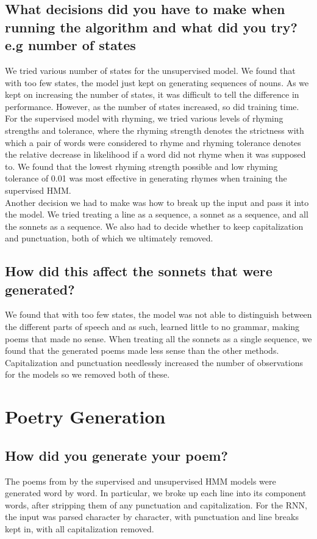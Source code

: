 \subsection{What decisions did you have to make when running the algorithm and what did you try? e.g number of states}
We tried various number of states for the unsupervised model. We found that with too few states, the model just kept on generating sequences of nouns. As we kept on increasing the number of states, it was difficult to tell the difference in performance. However, as the number of states increased, so did training time. \\
\indent For the supervised model with rhyming, we tried various levels of rhyming strengths and tolerance, where the rhyming strength denotes the strictness with which a pair of words were considered to rhyme and rhyming tolerance denotes the relative decrease in likelihood if a word did not rhyme when it was supposed to. We found that the lowest rhyming strength possible and low rhyming tolerance of 0.01 was most effective in generating rhymes when training the supervised HMM. \\
\indent Another decision we had to make was how to break up the input and pass it into the model. We tried treating a line as a sequence, a sonnet as a sequence, and all the sonnets as a sequence. We also had to decide whether to keep capitalization and punctuation, both of which we ultimately removed. 
\subsection{How did this affect the sonnets that were generated?}
We found that with too few states, the model was not able to distinguish between the different parts of speech and as such, learned little to no grammar, making poems that made no sense. When treating all the sonnets as a single sequence, we found that the generated poems made less sense than the other methods. Capitalization and punctuation needlessly increased the number of observations for the models so we removed both of these.

\section{Poetry Generation}
\medskip

\subsection{How did you generate your poem?}
The poems from by the supervised and unsupervised HMM models were generated word by word. In particular, we broke up each line into its component words, after stripping them of any punctuation and capitalization. For the RNN, the input was parsed character by character, with punctuation and line breaks kept in, with all capitalization removed.
